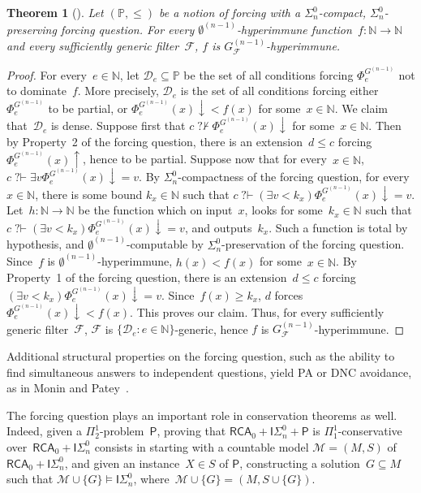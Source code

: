 \documentclass{article}
\def\NN{\mathbb{N}}
\def\PP{\mathbb{P}}
\def\F{\mathcal{F}}
\def\D{\mathcal{D}}
\def\M{\mathcal{M}}
\def\PP{\mathbb{P}}
\def\Psf{\mathsf{P}}
\newcommand{\converge}{\!\!\downarrow}
\newcommand{\diverge}{\!\!\uparrow}
\newcommand{\ISig}{\mathsf{I}\Sigma^0}
\newcommand{\qvdash}{\operatorname{{?}{\vdash}}}
\newcommand{\nqvdash}{\operatorname{{?}{\nvdash}}}
\newcommand{\RCA}{\mathsf{RCA}}
\newtheorem{theorem}{Theorem}
\numberwithin{theorem}{section}
\theoremstyle{definition}
\begin{document}
\begin{theorem}[\cite{monin201pigeons}]\label{thm:abstract-compact-hyperimmunity}
Let $(\PP, \leq)$ be a notion of forcing with a $\Sigma^0_n$-compact, $\Sigma^0_n$-preserving forcing question.
For every $\emptyset^{(n-1)}$-hyperimmune function~$f : \NN \to \NN$ and every sufficiently generic filter~$\F$, $f$ is $G_\F^{(n-1)}$-hyperimmune.
\end{theorem}
\begin{proof}
For every~$e \in \NN$, let $\D_e \subseteq \PP$ be the set of all conditions forcing $\Phi_e^{G^{(n-1)}}$ not to dominate~$f$. More precisely, $\D_e$ is the set of all conditions forcing either $\Phi_e^{G^{(n-1)}}$ to be partial, or $\Phi_e^{G^{(n-1)}}(x)\converge < f(x)$ for some~$x \in \NN$. We claim that~$\D_e$ is dense.
Suppose first that $c \nqvdash \Phi_e^{G^{(n-1)}}(x)\converge$ for some~$x \in \NN$. Then by Property~2 of the forcing question, there is an extension~$d \leq c$ forcing $\Phi_e^{G^{(n-1)}}(x)\diverge$, hence to be partial.
Suppose now that for every~$x \in \NN$, $c \qvdash \exists v \Phi_e^{G^{(n-1)}}(x)\converge = v$. By $\Sigma^0_n$-compactness of the forcing question, for every~$x \in \NN$, there is some bound $k_x \in \NN$ such that $c \qvdash (\exists v < k_x)\Phi_e^{G^{(n-1)}}(x)\converge = v$. Let~$h : \NN \to \NN$ be the function which on input~$x$, looks for some~$k_x \in \NN$ such that $c \qvdash (\exists v < k_x)\Phi_e^{G^{(n-1)}}(x)\converge = v$, and outputs~$k_x$. Such a function is total by hypothesis, and $\emptyset^{(n-1)}$-computable by $\Sigma^0_n$-preservation of the forcing question. Since~$f$ is $\emptyset^{(n-1)}$-hyperimmune, $h(x) < f(x)$ for some~$x \in \NN$. By Property~1 of the forcing question, there is an extension~$d \leq c$ forcing $(\exists v < k_x)\Phi_e^{G^{(n-1)}}(x)\converge = v$. Since~$f(x) \geq k_x$, $d$ forces $\Phi_e^{G^{(n-1)}}(x)\converge < f(x)$.
This proves our claim. Thus, for every sufficiently generic filter~$\F$, $\F$ is $\{\D_e : e \in \NN\}$-generic, hence $f$ is $G_\F^{(n-1)}$-hyperimmune.
\end{proof}

Additional structural properties on the forcing question, such as the ability to find simultaneous answers to independent questions, yield PA or DNC avoidance, as in Monin and Patey~\cite{monin2021srt}.

The forcing question plays an important role in conservation theorems as well. Indeed, given a $\Pi^1_2$-problem~$\Psf$, proving that $\RCA_0 + \ISig_n + \Psf$ is $\Pi^1_1$-conservative over~$\RCA_0 + \ISig_n$ consists in starting with a countable model $\M = (M, S)$ of $\RCA_0 + \ISig_n$, and given an instance~$X \in S$ of $\Psf$, constructing a solution~$G \subseteq M$ such that $\M \cup \{G\} \models \ISig_n$, where~$\M \cup \{G\} = (M, S \cup \{G\})$.
\end{document}
